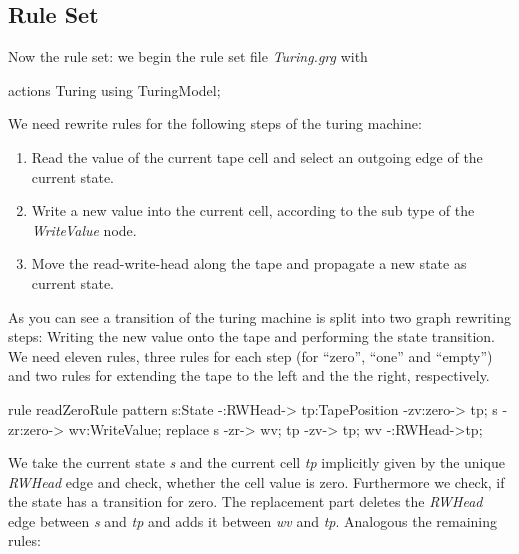 \subsection{Rule Set}
Now the rule set: we begin the rule set file \emph{Turing.grg} with
\begin{grgen}[firstnumber=1] 
actions Turing using TuringModel;

\end{grgen}
We need rewrite rules for the following steps of the turing machine:
\begin{enumerate}
  \item Read the value of the current tape cell and select an outgoing edge of the current state.
  \item Write a new value into the current cell, according to the sub type of the \emph{WriteValue} node.
  \item Move the read-write-head along the tape and propagate a new state as current state. 
\end{enumerate}
As you can see a transition of the turing machine is split into two graph rewriting steps: Writing the new value onto the tape and performing the state transition. We need eleven rules, three rules for each step (for ``zero'', ``one'' and ``empty'') and two rules for extending the tape to the left and the the right, respectively.
\begin{grgen}[firstnumber=last] 
rule readZeroRule {
	pattern {
		s:State -:RWHead-> tp:TapePosition -zv:zero-> tp;
		s -zr:zero-> wv:WriteValue;
	}
	replace {
		s -zr-> wv;
		tp -zv-> tp;
		wv -:RWHead->tp;
	}
}      

\end{grgen}
We take the current state \emph{s} and the current cell \emph{tp} implicitly given by the unique \emph{RWHead} edge and check, whether the cell value is zero. Furthermore we check, if the state has a transition for zero. The replacement part deletes the \emph{RWHead} edge between \emph{s} and \emph{tp} and adds it between \emph{wv} and \emph{tp}. Analogous the remaining rules:
